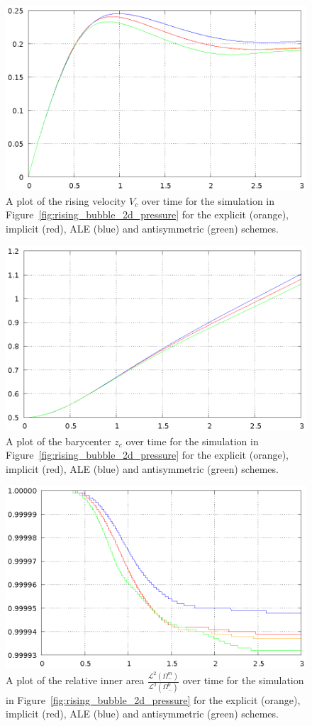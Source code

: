 \begin{figure}[htbp]
\centering
\includegraphics[width=.45\textwidth]
{figures/navier_stokes/2d_rising_bubble_rising_velocity.ps}
\caption[Navier--Stokes 2d rising bubble rising velocity]
{A plot of the rising velocity $V_c$ over time for the simulation in
Figure~\ref{fig:rising_bubble_2d_pressure} for the explicit (orange), implicit
(red), ALE (blue) and antisymmetric (green) schemes.}
\label{fig:rising_bubble_2d_bulk_rising_velocity}
\end{figure}

\begin{figure}[htbp]
\centering
\includegraphics[width=.45\textwidth]
{figures/navier_stokes/2d_rising_bubble_barycenter.ps}
\caption[Navier--Stokes 2d rising bubble barycenter]
{A plot of the barycenter $z_c$ over time for the simulation in
Figure~\ref{fig:rising_bubble_2d_pressure} for the explicit (orange), implicit
(red), ALE (blue) and antisymmetric (green) schemes.}
\label{fig:rising_bubble_2d_bulk_barycenter}
\end{figure}

\begin{figure}[htbp]
\centering
\includegraphics[width=.45\textwidth]
{figures/navier_stokes/2d_rising_bubble_inner_volume.ps}
\caption[Navier--Stokes 2d rising bubble inner area]
{A plot of the relative inner area
$\frac{\mathcal{L}^2(\Omega^m_-)}{\mathcal{L}^2(\Omega^0_-)}$
over time for the simulation in Figure~\ref{fig:rising_bubble_2d_pressure} for
the explicit (orange), implicit (red), ALE (blue) and antisymmetric (green)
schemes.}
\label{fig:rising_bubble_2d_bulk_inner_volume}
\end{figure}